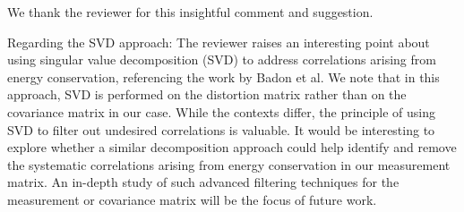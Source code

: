 \documentclass[12pt]{article}
\newcommand{\hlred}[1]{\sethlcolor{red!30}\hl{#1}}
\newenvironment{ourresponse}
    {\begin{tcolorbox}[width=\linewidth,breakable,enhanced,colback=gray!5,colframe=responsecolor!50,title=Response,left=5pt,right=5pt]}
    {\end{tcolorbox}}
\begin{document}
\begin{ourresponse}

    
We thank the reviewer for this insightful comment and suggestion.

Regarding the SVD approach: The reviewer raises an interesting point about using singular value decomposition (SVD) to address correlations arising from energy conservation, referencing the work by Badon et al.\cite{badon2020distortion} We note that in this approach, SVD is performed on the distortion matrix rather than on the covariance matrix in our case. While the contexts differ, the principle of using SVD to filter out undesired correlations is valuable. It would be interesting to explore whether a similar decomposition approach could help identify and remove the systematic correlations arising from energy conservation in our measurement matrix. An in-depth study of such advanced filtering techniques for the measurement or covariance matrix will be the focus of future work.


\end{ourresponse}
\end{document}
